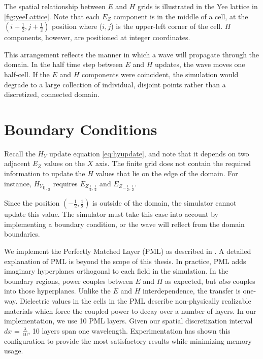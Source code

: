 The spatial relationship between $E$ and $H$ grids is illustrated in the Yee lattice in \autoref{fig:yeeLattice}. Note that each $E_Z$ component is in the middle of a cell, at the $(i + \frac{1}{2}, j + \frac{1}{2})$ position where ($i,j$) is  the upper-left corner of the cell. $H$ components, however, are positioned at integer coordinates.

This arrangement reflects the manner in which a wave will propagate through the domain. In the half time step between $E$ and $H$ updates, the wave moves one half-cell. If the $E$ and $H$ components were coincident, the simulation would degrade to a large collection of individual, disjoint points rather than a discretized, connected domain.


\section{Boundary Conditions}

Recall the $H_Y$ update equation \autoref{eq:hyupdate}, and note that it depends on two adjacent $E_Z$ values on the $X$ axis. The finite grid does not contain the required information to update the $H$ values that lie on the edge of the domain. For instance, ${H_Y}_{0,\frac{1}{2}}$ requires ${E_Z}_{\frac{1}{2},\frac{1}{2}}$ and ${E_Z}_{-\frac{1}{2},\frac{1}{2}}$.

Since the position $(-\frac{1}{2},\frac{1}{2})$ is outside of the domain, the simulator cannot update this value. The simulator must take this case into account by implementing a boundary condition, or the wave will reflect from the domain boundaries. 

We implement the Perfectly Matched Layer (PML) as described in \cite{BERENGER1994185}. A detailed explanation of PML is beyond the scope of this thesis. In practice, PML adds imaginary hyperplanes orthogonal to each field in the simulation. In the boundary regions, power couples between $E$ and $H$ as expected, but \emph{also} couples into those hyperplanes. Unlike the $E$ and $H$ interdependence, the transfer is one-way. Dielectric values in the cells in the PML describe non-physically realizable materials which force the coupled power to decay over a number of layers. In our implementation, we use 10 PML layers. Given our spatial discretization interval $dx$ = $\frac{\lambda}{10}$, 10 layers span one wavelength. Experimentation has shown this configuration to provide the most satisfactory results while minimizing memory usage.



